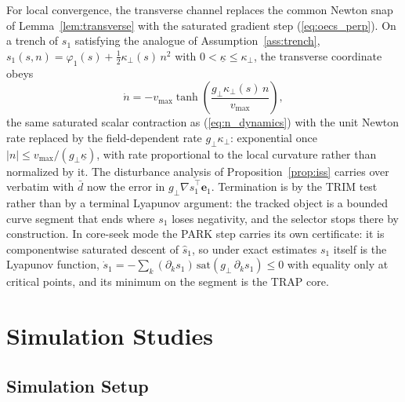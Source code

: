 \documentclass[lettersize,journal]{IEEEtran}
\begin{document}
For local convergence, the transverse channel replaces the common
Newton snap of Lemma~\ref{lem:transverse} with the saturated gradient
step (\ref{eq:oecs_perp}). On a trench of $s_1$ satisfying the analogue
of Assumption~\ref{ass:trench}, $s_1(s, n) = \varphi_1(s) +
\tfrac{1}{2}\kappa_\perp(s)\,n^2$ with $0 < \underline{\kappa} \leq
\kappa_\perp$, the transverse coordinate obeys
\begin{equation}
    \dot{n} = -v_{\max}\tanh\!\left(
    \frac{g_\perp \kappa_\perp(s)\,n}{v_{\max}}\right),
    \label{eq:oecs_n_dynamics}
\end{equation}
the same saturated scalar contraction as (\ref{eq:n_dynamics}) with the
unit Newton rate replaced by the field-dependent rate $g_\perp
\kappa_\perp$: exponential once $|n| \leq v_{\max}/(g_\perp
\underline{\kappa})$, with rate proportional to the local curvature
rather than normalized by it. The disturbance analysis of
Proposition~\ref{prop:iss} carries over verbatim with $\bar{d}$ now the
error in $g_\perp \nabla\hat{s}_1^\top\mathbf{e}_1$. Termination is by
the TRIM test rather than by a terminal Lyapunov argument: the tracked
object is a bounded curve segment that ends where $s_1$ loses
negativity, and the selector stops there by construction. In core-seek
mode the PARK step carries its own certificate: it is componentwise
saturated descent of $\hat{s}_1$, so under exact estimates $s_1$ itself
is the Lyapunov function, $\dot{s}_1 = -\sum_k (\partial_k s_1)\,
\mathrm{sat}(g_\perp\,\partial_k s_1) \leq 0$ with equality only at
critical points, and its minimum on the segment is the TRAP core.


\section{Simulation Studies}
\label{sec:methods}
\label{sec:results}

\subsection{Simulation Setup}
\end{document}

